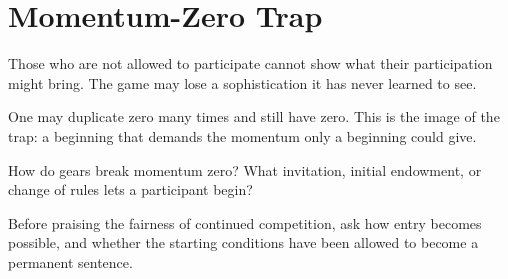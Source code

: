 \chapter{Momentum-Zero Trap}
\label{short:momentum-zero-trap}

Those who are not allowed to participate cannot show what their participation
might bring. The game may lose a sophistication it has never learned to see.

One may duplicate zero many times and still have zero. This is the image of
the trap: a beginning that demands the momentum only a beginning could give.

How do gears break momentum zero? What invitation, initial endowment, or
change of rules lets a participant begin?

Before praising the fairness of continued competition, ask how entry becomes
possible, and whether the starting conditions have been allowed to become a
permanent sentence.


